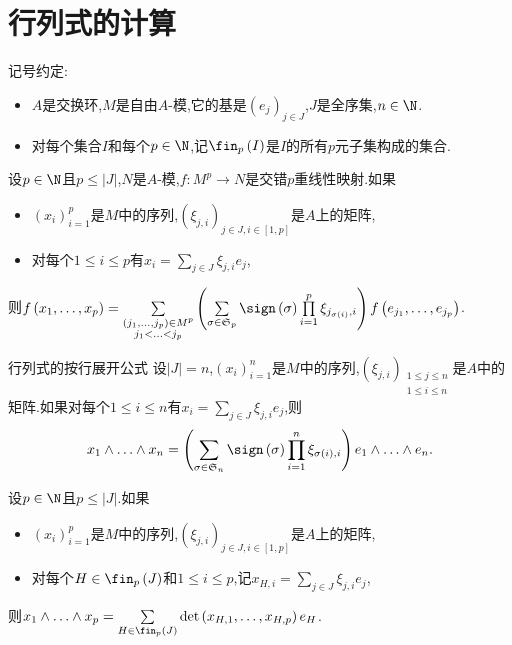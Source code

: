 \section{行列式的计算}

记号约定:
\begin{itemize}
	\item $A$是交换环,$M$是自由$A$-模,它的基是$\left(e_{j}\right)_{j\in J}$,$J$是全序集,$n\in\N$.
	\item 对每个集合$I$和每个$p\in\N$,记$\fin_{p}\left(I\right)$是$I$的所有$p$元子集构成的集合.
\end{itemize}

\begin{lemma}{}{}
	设$p\in\N$且$p\leq\left|J\right|$,$N$是$A$-模,$f:M^{p}\to N$是交错$p$重线性映射.如果
	\begin{itemize}
		\item $\left(x_{i}\right)_{i=1}^{p}$是$M$中的序列,$\left(\xi_{j,i}\right)_{j\in J,i\in\left[1,p\right]}$是$A$上的矩阵,
		\item 对每个$1\leq i\leq p$有$x_{i}=\sum\limits_{j\in J}\xi_{j,i}e_{j}$,
	\end{itemize}
	则$f\left(x_{1},\ldots,x_{p}\right)=\sum\limits_{\substack{\left(j_{1},\ldots,j_{p}\right)\in M^{p}\\ j_{1}<\ldots<j_{p}}}\left(\sum\limits_{\sigma\in\mathfrak{S}_{p}}\sign\left(\sigma\right)\prod\limits_{i=1}^{p}\xi_{j_{\sigma\left(i\right)},i}\right)f\left(e_{j_{1}},\ldots,e_{j_{p}}\right)$.
\end{lemma}

\begin{proposition}{行列式的按行展开公式}{}
	设$\left|J\right|=n$,$\left(x_{i}\right)_{i=1}^{n}$是$M$中的序列,$\left(\xi_{j,i}\right)_{\substack{1\leq j\leq n\\1\leq i\leq n}}$是$A$中的矩阵.如果对每个$1\leq i\leq n$有$x_{i}=\sum\limits_{j\in J}\xi_{j,i}e_{j}$,则
	\begin{align*}
		x_{1}\wedge\ldots\wedge x_{n}=\left(\sum\limits_{\sigma\in\mathfrak{S}_{n}}\sign\left(\sigma\right)\prod\limits_{i=1}^{n}\xi_{\sigma\left(i\right),i}\right)e_{1}\wedge\ldots\wedge e_{n}.
	\end{align*}
\end{proposition}

\begin{proposition}{}{}
	设$p\in\N$且$p\leq\left|J\right|$.如果
	\begin{itemize}
		\item $\left(x_{i}\right)_{i=1}^{p}$是$M$中的序列,$\left(\xi_{j,i}\right)_{j\in J,i\in\left[1,p\right]}$是$A$上的矩阵,
		\item 对每个$H\in\fin_{p}\left(J\right)$和$1\leq i\leq p$,记$x_{H,i}=\sum\limits_{j\in J}\xi_{j,i}e_{j}$,
	\end{itemize}
	则$x_{1}\wedge\ldots\wedge x_{p}=\sum\limits_{H\in\fin_{p}\left(J\right)}\det\left(x_{H,1},\ldots,x_{H,p}\right)e_{H}$.
\end{proposition}

